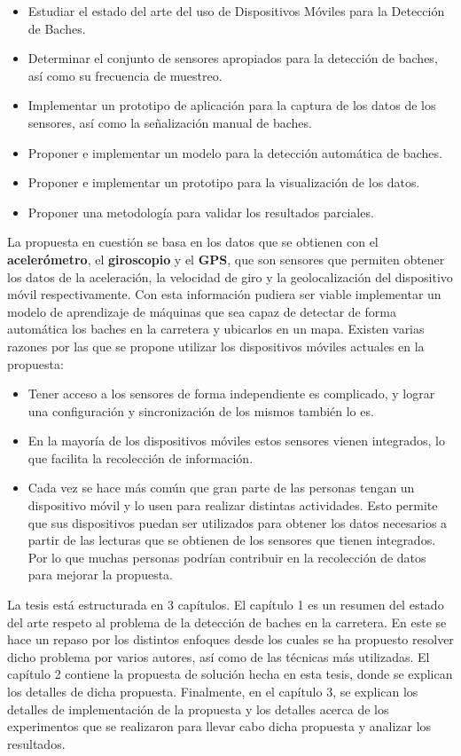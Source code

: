 \begin{itemize}
	\item Estudiar el estado del arte del uso de Dispositivos Móviles para la Detección de Baches.
	\item Determinar el conjunto de sensores apropiados para la detección de baches, así como su frecuencia de muestreo.
	\item Implementar un prototipo de aplicación para la captura de los datos de los sensores, así como la señalización
		manual de baches.
	\item Proponer e implementar un modelo para la detección automática de baches.
	\item Proponer e implementar un prototipo para la visualización de los datos.
	\item Proponer una metodología para validar los resultados parciales.
\end{itemize}

\indent La propuesta en cuestión se basa en los datos que se obtienen con el \textbf{acelerómetro}, el \textbf{giroscopio} y el \textbf{GPS}, que
son sensores que permiten obtener los datos de la aceleración, la velocidad de giro y la geolocalización del dispositivo móvil respectivamente.
Con esta información pudiera ser viable implementar un modelo de aprendizaje de máquinas que sea capaz de detectar de forma automática los baches
en la carretera y ubicarlos en un mapa. Existen varias razones por las que se propone utilizar los dispositivos móviles actuales en la propuesta:\\

\begin{itemize}
	\item Tener acceso a los sensores de forma independiente es complicado, y lograr una configuración y sincronización de los mismos también lo es.
	\item En la mayoría de los dispositivos móviles estos sensores vienen integrados, lo que facilita la recolección de información.
	\item Cada vez se hace más común que gran parte de las personas tengan un dispositivo móvil y lo usen para realizar distintas actividades.
		Esto permite que sus dispositivos puedan ser utilizados para obtener los datos necesarios a partir de las lecturas que se obtienen de los
		sensores que tienen integrados. Por lo que muchas personas podrían contribuir en la recolección de datos para mejorar la propuesta.
\end{itemize}

La tesis está estructurada en 3 capítulos. El capítulo 1 es un resumen del estado del arte respeto al problema de la detección de baches en
la carretera. En este se hace un repaso por los distintos enfoques desde los cuales se ha propuesto resolver dicho problema por varios autores,
así como de las técnicas más utilizadas. El capítulo 2 contiene la propuesta de solución hecha en esta tesis, donde se explican los detalles de 
dicha propuesta. Finalmente, en el capítulo 3, se explican los detalles de implementación de la propuesta y los detalles acerca de los experimentos
que se realizaron para llevar cabo dicha propuesta y analizar los resultados.
